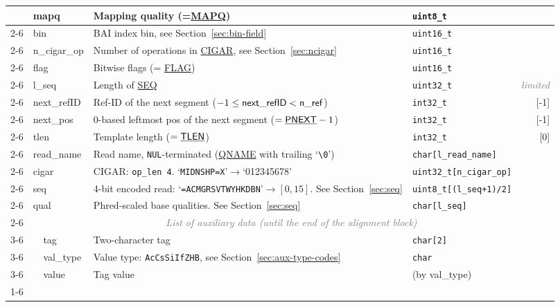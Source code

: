 \documentclass[10pt]{article}
\newcommand*{\memlimited}{\textcolor{gray}{\footnotesize\it limited}}
\begin{document}
\begin{table}[ht]
{\begin{tabular}{|l|l|l|p{8.15cm}|l|r|}
  & \multicolumn{2}{l|}{\sf mapq} & Mapping quality (=\underline{\sf MAPQ}) & {\tt uint8\_t} & \\\cline{2-6}
  & \multicolumn{2}{l|}{\sf bin} & BAI index bin, see Section~\ref{sec:bin-field}  & {\tt uint16\_t} & \\\cline{2-6}
  & \multicolumn{2}{l|}{\sf n\_cigar\_op} & Number of operations in \underline{\sf CIGAR}, see Section~\ref{sec:ncigar} & {\tt uint16\_t} & \\\cline{2-6}
  & \multicolumn{2}{l|}{\sf flag} & Bitwise flags (= \underline{\sf FLAG})\footnotemark\ & {\tt uint16\_t} & \\\cline{2-6}
  & \multicolumn{2}{l|}{\sf l\_seq} & Length of \underline{\sf SEQ} & {\tt uint32\_t} & \memlimited \\\cline{2-6}
  & \multicolumn{2}{l|}{\sf next\_refID} & Ref-ID of the next segment ($-1\le{\sf next\_refID}<{\sf n\_ref}$) & {\tt int32\_t} & [-1] \\\cline{2-6}
  & \multicolumn{2}{l|}{\sf next\_pos} & 0-based leftmost pos of the next segment ($=\underline{\sf PNEXT}-1$) & {\tt int32\_t} & [-1] \\\cline{2-6}
  & \multicolumn{2}{l|}{\sf tlen} & Template length ($=\underline{\sf TLEN}$) & {\tt int32\_t} & [0] \\\cline{2-6}
  & \multicolumn{2}{l|}{\sf read\_name} & Read name, {\tt NUL}-terminated (\underline{\sf QNAME} with trailing `{\tt\verb"\0"}')\footnotemark & {\tt char[{\sf l\_read\_name}]} & \\\cline{2-6}
  & \multicolumn{2}{l|}{\sf cigar} & CIGAR: {\tt {\sf op\_len}\char60\char60 4\char124{\sf op}}. `{\tt MIDNSHP=X}'$\to$`012345678' & {\tt uint32\_t[{\sf n\_cigar\_op}]} & \\\cline{2-6}
  & \multicolumn{2}{l|}{\sf seq} & 4-bit encoded read: `{\tt =ACMGRSVTWYHKDBN}'$\to[0,15]$. See Section~\ref{sec:seq} & {\tt uint8\_t[({\sf l\_seq}+1)/2]} & \\\cline{2-6}
  & \multicolumn{2}{l|}{\sf qual} & Phred-scaled base qualities. See Section~\ref{sec:seq} & {\tt char[{\sf l\_seq}]} & \\\cline{2-6}
  & \multicolumn{5}{c|}{\textcolor{gray}{\it List of auxiliary data (until the end of the alignment block)}} \\\cline{3-6}
  & & {\sf tag} & Two-character tag & {\tt char[2]} & \\\cline{3-6}
  & & {\sf val\_type} & Value type: {\tt AcCsSiIfZHB}, see Section~\ref{sec:aux-type-codes} & {\tt char} & \\\cline{3-6}
  & & {\sf value} & Tag value & (by {\sf val\_type}) &\\
  \cline{1-6}
\end{tabular}}
\end{table}
\addtocounter{footnote}{-1}
\end{document}
